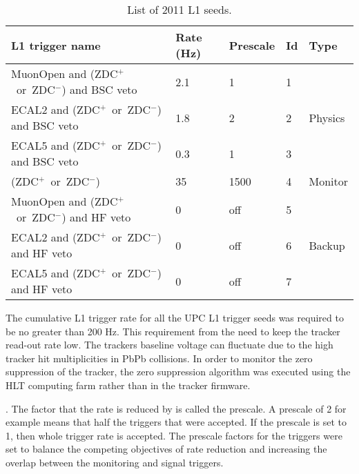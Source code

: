     \begin{table}[h]
      \centering
      \begin{tabular}{|l|l|l|l|l|}
        \hline L1 trigger name & Rate (Hz) & Prescale & Id & Type \\ \hline \hline
        MuonOpen and (ZDC$^{+}$~or~ZDC$^{-}$) and BSC veto & 2.1 & 1 & 1 & \multirow{3}{*}{Physics} \\  \hhline{----~}
        ECAL2 and (ZDC$^{+}$~or~ZDC$^{-}$) and BSC veto & 1.8 & 2 & 2 & \\  \hhline{----~}
        ECAL5 and (ZDC$^{+}$~or~ZDC$^{-}$) and BSC veto & 0.3 & 1 & 3 & \\  \hline
        (ZDC$^{+}$~or~ZDC$^{-}$) & 35 & 1500 & 4 & Monitor \\  \hline
        MuonOpen and (ZDC$^{+}$~or~ZDC$^{-}$) and HF veto & 0 & off & 5 & \multirow{3}{*}{Backup} \\ \hhline{----~}
        ECAL2 and (ZDC$^{+}$~or~ZDC$^{-}$) and HF veto & 0 & off & 6 & \\  \hhline{----~}
        ECAL5 and (ZDC$^{+}$~or~ZDC$^{-}$) and HF veto & 0 & off & 7 & \\  \hline
      \end{tabular}
      \caption{List of 2011 L1 seeds.}
      \label{tab:l1Triggers2011}
    \end{table}
    The cumulative L1 trigger rate for all the UPC L1 trigger seeds was
      required to be no greater than 200 Hz.
    This requirement \DIFdelbegin {}\DIFdelend \DIFaddbegin {}\DIFaddend from the need to keep the tracker read-out rate
      low. 
    The trackers baseline voltage can fluctuate due to the high tracker hit 
      multiplicities in PbPb collisions.
    In order to monitor the zero suppression of the tracker, the zero 
      suppression algorithm was executed using the HLT computing farm 
	      rather than in the tracker firmware.

    \DIFdelbegin {}\DIFdelend \DIFaddbegin {}\DIFaddend . 
    The factor that the \DIFdelbegin {}\DIFdelend rate is reduced by is called the prescale.
    A prescale of 2 for example means that half the triggers that were 
      accepted.
    If the prescale is set to 1, then whole trigger rate is accepted. 
    The prescale factors for the triggers were set to balance the competing objectives 
      of rate reduction and increasing the overlap between the monitoring and
      signal triggers.

